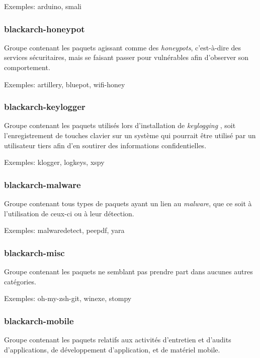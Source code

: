 \documentclass[a4paper, oneside, 11pt]{book}
\begin{document}
Exemples: arduino, smali

\subsubsection{blackarch-honeypot}

Groupe contenant les paquets agissant comme des \textit{honeypots}, c'est-\`{a}-dire des services s\'{e}curitaires, mais se faisant passer pour vuln\'{e}rables afin d'observer son comportement.

Exemples: artillery, bluepot, wifi-honey

\subsubsection{blackarch-keylogger}

Groupe contenant les paquets utilis\'{e}s lors d'installation de \textit{keylogging}
, soit l'enregistrement de touches clavier sur un syst\`{e}me qui pourrait \^{e}tre
utilis\'{e} par un utilisateur tiers afin d'en soutirer des informations confidentielles.

Exemples: klogger, logkeys, xspy

\subsubsection{blackarch-malware}

Groupe contenant tous types de paquets ayant un lien au \textit{malware}, que ce soit \`{a} l'utilisation de ceux-ci ou \`{a} leur d\'{e}tection.

Exemples: malwaredetect, peepdf, yara

\subsubsection{blackarch-misc}

Groupe contenant les paquets ne semblant pas prendre part dans aucunes autres
cat\'{e}gories.

Exemples: oh-my-zsh-git, winexe, stompy

\subsubsection{blackarch-mobile}

Groupe contenant les paquets relatifs aux activit\'{e}s d'entretien et d'audits
d'applications, de d\'{e}veloppement d'application, et de mat\'{e}riel mobile.
\end{document}
